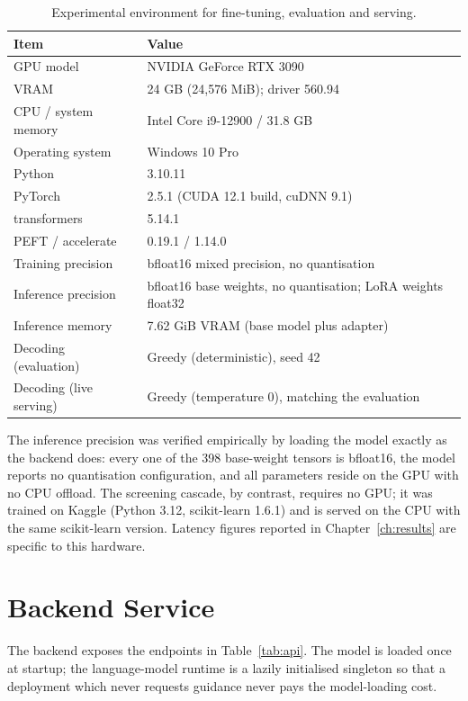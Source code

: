 \begin{table}[H]
\centering
\caption{Experimental environment for fine-tuning, evaluation and serving.}
\label{tab:env}
\small
\begin{tabularx}{\textwidth}{@{}L{1.75in} X@{}}
\toprule
\textbf{Item} & \textbf{Value} \\
\midrule
GPU model & NVIDIA GeForce RTX 3090 \\
VRAM & 24 GB (24{,}576 MiB); driver 560.94 \\
CPU / system memory & Intel Core i9-12900 / 31.8 GB \\
Operating system & Windows 10 Pro \\
Python & 3.10.11 \\
PyTorch & 2.5.1 (CUDA 12.1 build, cuDNN 9.1) \\
transformers & 5.14.1 \\
PEFT / accelerate & 0.19.1 / 1.14.0 \\
Training precision & bfloat16 mixed precision, no quantisation \\
Inference precision & bfloat16 base weights, no quantisation; LoRA
weights float32 \\
Inference memory & 7.62 GiB VRAM (base model plus adapter) \\
Decoding (evaluation) & Greedy (deterministic), seed 42 \\
Decoding (live serving) & Greedy (temperature 0), matching the evaluation \\
\bottomrule
\end{tabularx}
\end{table}

The inference precision was verified empirically by loading the model exactly as
the backend does: every one of the 398 base-weight tensors is bfloat16, the
model reports no quantisation configuration, and all parameters reside on the
GPU with no CPU offload. The screening cascade, by contrast, requires no GPU; it
was trained on Kaggle (Python 3.12, scikit-learn 1.6.1) and is served on the CPU
with the same scikit-learn version. Latency figures reported in
Chapter~\ref{ch:results} are specific to this hardware.

\section{Backend Service}
\label{sec:backend}

The backend exposes the endpoints in Table~\ref{tab:api}. The model is loaded
once at startup; the language-model runtime is a lazily initialised singleton so
that a deployment which never requests guidance never pays the model-loading
cost.

